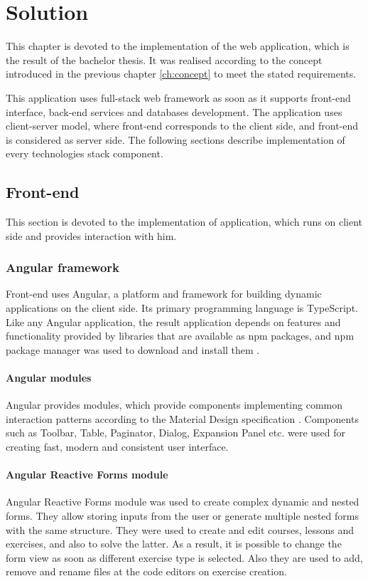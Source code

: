 \chapter[Solution]{Solution}
\label{ch:solution}
This chapter is devoted to the implementation of the web application, which is the result of the bachelor thesis. It was realised according to the concept introduced in the previous chapter \ref{ch:concept}  to meet the stated requirements.

This application uses full-stack web framework as soon as it supports front-end interface, back-end services and databases development. The application uses client-server model, where front-end corresponds to the client side, and front-end is considered as server side. The following sections describe implementation of every technologies stack component.

\section{Front-end}
This section is devoted to the implementation of application, which runs on client side and provides interaction with him.

\subsection{Angular framework}
Front-end uses Angular, a platform and framework for building dynamic applications on the client side. Its primary programming language is TypeScript. Like any Angular application, the result application depends on features and functionality provided by libraries that are available as npm packages, and npm package manager was used to download and install them \cite[Node.js]{angular_getting_started}.

\subsubsection{Angular modules}
Angular provides modules, which provide components implementing common interaction patterns according to the Material Design specification \cite[Components]{angular_components}. Components such as Toolbar, Table, Paginator, Dialog, Expansion Panel etc. were used for creating fast, modern and consistent user interface.

\subsubsection{Angular Reactive Forms module}
Angular Reactive Forms module was used to create complex dynamic and nested forms. They allow storing inputs from the user or generate multiple nested forms with the same structure. They were used to create and edit courses, lessons and exercises, and also to solve the latter. As a result, it is possible to change the form view as soon as different exercise type is selected. Also they are used to add, remove and rename files at the code editors on exercise creation.

